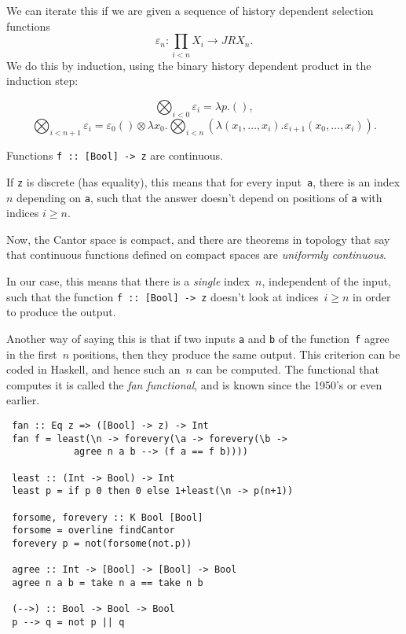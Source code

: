 We can iterate this if we are given a sequence of history dependent
selection functions 
\[
\varepsilon_n \colon \prod_{i < n} X_i \to J R X_n.
\]
We do this by induction, using the binary history dependent product in
the induction step:

\begin{footnotesize}
\[
  \bigotimes_{i < 0} \varepsilon_i   =   \lambda p.(),
\]
\[  
\bigotimes_{i < n+1} \varepsilon_i   =  \varepsilon_0() \otimes \lambda x_0.\bigotimes_{i < n} (\lambda (x_1,\dots,x_{i}).\varepsilon_{i+1}(x_0,\dots,x_{i})).
\]
\end{footnotesize}

\noindent




Functions \verb+f :: [Bool] -> z+ are continuous. 

If \verb+z+ is discrete (has equality), this means that for every
input~\verb+a+, there is an index $n$ depending on \verb+a+, such that
the answer doesn't depend on positions of \verb+a+ with indices $i \ge
n$. 

Now,
the Cantor space is compact, and there are theorems in topology that
say that continuous functions defined on compact
spaces are \emph{uniformly continuous}. 

In our case, this means that
there is a \emph{single} index~$n$, independent of the input,
such that the function \verb+f :: [Bool] -> z+ doesn't look at indices~$i
\ge n$ in order to produce the output. 

Another way of saying this is
that if two inputs \verb+a+ and \verb+b+ of the function~\verb+f+
agree in the first~$n$ positions, then they produce the same
output. This criterion can be coded in Haskell, and hence such an~$n$
can be computed. The functional that computes it is called the
\emph{fan functional}, and is known since the 1950's or even
earlier.


\begin{verbatim}
 fan :: Eq z => ([Bool] -> z) -> Int
 fan f = least(\n -> forevery(\a -> forevery(\b -> 
            agree n a b --> (f a == f b))))

 least :: (Int -> Bool) -> Int
 least p = if p 0 then 0 else 1+least(\n -> p(n+1))

 forsome, forevery :: K Bool [Bool]
 forsome = overline findCantor 
 forevery p = not(forsome(not.p))
 
 agree :: Int -> [Bool] -> [Bool] -> Bool
 agree n a b = take n a == take n b

 (-->) :: Bool -> Bool -> Bool
 p --> q = not p || q
\end{verbatim}

